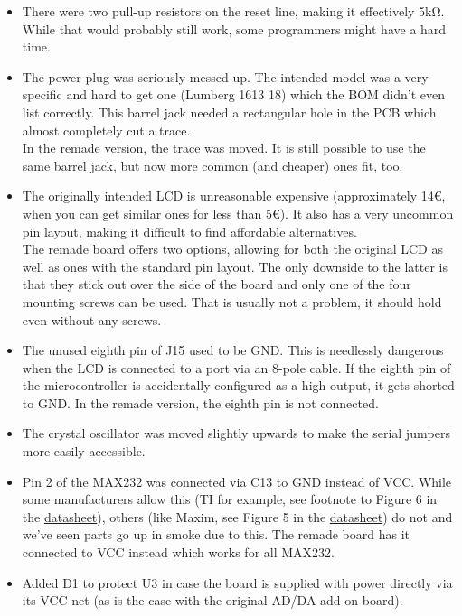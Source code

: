 \documentclass{article}
\begin{document}
\begin{itemize}
\item There were two pull-up resistors on the reset line, making it effectively 5kΩ. While that would probably still work, some programmers might have a hard time. 
\item The power plug was seriously messed up. The intended model was a very specific and hard to get one (Lumberg 1613 18) which the BOM didn't even list correctly. This barrel jack needed a rectangular hole in the PCB which almost completely cut a trace.\\
In the remade version, the trace was moved. It is still possible to use the same barrel jack, but now more common (and cheaper) ones fit, too. 
\item The originally intended LCD is unreasonable expensive (approximately 14\euro{}, when you can get similar ones for less than 5\euro{}). It also has a very uncommon pin layout, making it difficult to find affordable alternatives.\\
The remade board offers two options, allowing for both the original LCD as well as ones with the standard pin layout. The only downside to the latter is that they stick out over the side of the board and only one of the four mounting screws can be used. That is usually not a problem, it should hold even without any screws. 
\item The unused eighth pin of J15 used to be GND. This is needlessly dangerous when the LCD is connected to a port via an 8-pole cable. If the eighth pin of the microcontroller is accidentally configured as a high output, it gets shorted to GND. In the remade version, the eighth pin is not connected. 
\item The crystal oscillator was moved slightly upwards to make the serial jumpers more easily accessible. 
\item Pin 2 of the MAX232 was connected via C13 to GND instead of VCC. While some manufacturers allow this (TI for example, see footnote to Figure 6 in the \href{https://www.ti.com/lit/ds/symlink/max232.pdf}{datasheet}), others (like Maxim, see Figure 5 in the \href{https://www.analog.com/media/en/technical-documentation/data-sheets/max220-max249.pdf}{datasheet}) do not and we've seen parts go up in smoke due to this. The remade board has it connected to VCC instead which works for all MAX232. 
\item Added D1 to protect U3 in case the board is supplied with power directly via its VCC net (as is the case with the original AD/DA add-on board). 

\end{itemize}
\end{document}
